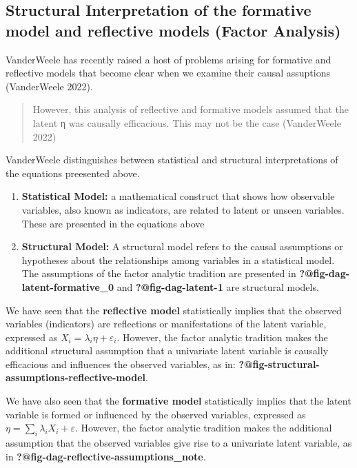 \documentclass[
  letterpaper,
  DIV=11,
  numbers=noendperiod]{scrartcl}
\begin{document}
\hypertarget{structural-interpretation-of-the-formative-model-and-reflective-models-factor-analysis}{%
\subsection{Structural Interpretation of the formative model and
reflective models (Factor
Analysis)}\label{structural-interpretation-of-the-formative-model-and-reflective-models-factor-analysis}}

VanderWeele has recently raised a host of problems arising for formative
and reflective models that become clear when we examine their causal
assuptions (VanderWeele 2022).

\begin{quote}
However, this analysis of reflective and formative models assumed that
the latent η was causally efficacious. This may not be the case
(VanderWeele 2022)
\end{quote}

VanderWeele distinguishes between statistical and structural
interpretations of the equations preesented above.

\begin{enumerate}
\def\labelenumi{\arabic{enumi}.}
\item
  \textbf{Statistical Model:} a mathematical construct that shows how
  observable variables, also known as indicators, are related to latent
  or unseen variables. These are presented in the equations above
\item
  \textbf{Structural Model:} A structural model refers to the causal
  assumptions or hypotheses about the relationships among variables in a
  statistical model. The assumptions of the factor analytic tradition
  are presented in \textbf{?@fig-dag-latent-formative\_0} and
  \textbf{?@fig-dag-latent-1} are structural models.
\end{enumerate}

We have seen that the \textbf{reflective model} statistically implies
that the observed variables (indicators) are reflections or
manifestations of the latent variable, expressed as
\(X_i = \lambda_i \eta + \varepsilon_i\). However, the factor analytic
tradition makes the additional structural assumption that a univariate
latent variable is causally efficacious and influences the observed
variables, as in:
\textbf{?@fig-structural-assumptions-reflective-model}.

We have also seen that the \textbf{formative model} statistically
implies that the latent variable is formed or influenced by the observed
variables, expressed as \(\eta = \sum_i\lambda_i X_i + \varepsilon\).
However, the factor analytic tradition makes the additional assumption
that the observed variables give rise to a univariate latent variable,
as in \textbf{?@fig-dag-reflective-assumptions\_note}.
\end{document}
